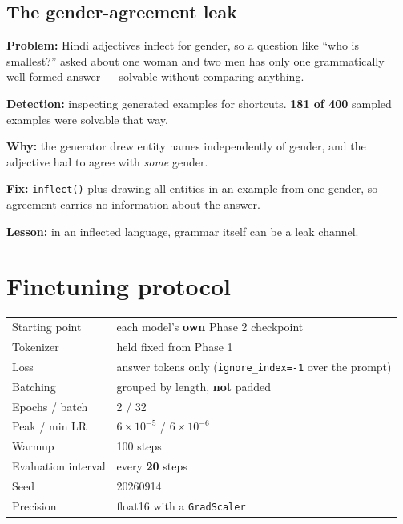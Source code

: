 \documentclass[11pt]{report}
\begin{document}
\subsection{The gender-agreement leak}

\begin{trap}
\textbf{Problem:} Hindi adjectives inflect for gender, so a question like ``who
is smallest?'' asked about one woman and two men has only one grammatically
well-formed answer --- solvable without comparing anything.

\smallskip
\textbf{Detection:} inspecting generated examples for shortcuts.
\textbf{181 of 400} sampled examples were solvable that way.

\smallskip
\textbf{Why:} the generator drew entity names independently of gender, and the
adjective had to agree with \emph{some} gender.

\smallskip
\textbf{Fix:} \texttt{inflect()} plus drawing all entities in an example from one
gender, so agreement carries no information about the answer.

\smallskip
\textbf{Lesson:} in an inflected language, grammar itself can be a leak channel.
\end{trap}

\section{Finetuning protocol}

\begin{center}\small
\begin{tabular}{ll}
\toprule
Starting point & each model's \textbf{own} Phase 2 checkpoint \\
Tokenizer & held fixed from Phase 1 \\
Loss & answer tokens only (\texttt{ignore\_index=-1} over the prompt) \\
Batching & grouped by length, \textbf{not} padded \\
Epochs / batch & 2 / 32 \\
Peak / min LR & $6\times10^{-5}$ / $6\times10^{-6}$ \\
Warmup & 100 steps \\
Evaluation interval & every \textbf{20} steps \\
Seed & 20260914 \\
Precision & float16 with a \texttt{GradScaler} \\
\bottomrule
\end{tabular}
\end{center}
\end{document}
